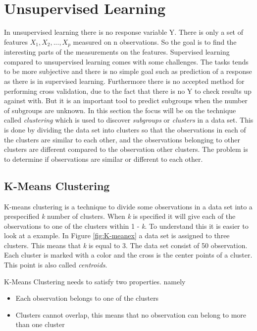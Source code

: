 \chapter{Unsupervised Learning}
\label{chp:unsuplea}
In unsupervised learning there is no response variable Y. There is only a set of features $X_1, X_2,..., X_p$ measured on n observations. So the goal is to find the interesting parts of the measurements on the features.
Supervised learning compared to unsupervised learning comes with some challenges. The tasks tends to be more subjective and there is no simple goal such as prediction of a response as there is in supervised learning. Furthermore there is no accepted method for performing cross validation, due to the fact that there is no Y to check results up against with.
But it is an important tool to predict subgroups when the number of subgroups are unknown.
In this section the focus will be on the  technique called \emph{clustering} which is used to discover \emph{subgroups} or \emph{clusters} in a data set. 
This is done by dividing the data set into clusters so that the observations in each of the clusters are similar to each other, and the observations belonging to other clusters are different compared to the observation other clusters.
The problem is to determine if observations are similar or different to each other.
 
\section{K-Means Clustering}
\label{chp:clus}
K-means clustering is a technique to divide some observations in a data set into a prespecified \emph{k} number of clusters. When \emph{k} is specified it will give each of the observations to one of the clusters within 1 - \emph{k}. To understand this it is easier to look at a example. In
Figure \ref{fig:K-meanex} a data set is assigned to three clusters. This means that \emph{k} is equal to 3. The data set consist of 50 observation. Each cluster is marked with a color and the cross is the center points of a cluster. This point is also called \emph{centroids}.


K-Means Clustering needs to satisfy two properties. namely
\begin{itemize}
	\item Each observation belongs to one of the clusters
	\item Clusters cannot overlap, this means that no observation can belong to more than one cluster
\end{itemize} 

